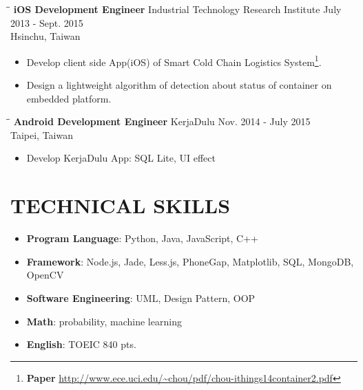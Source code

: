 \documentclass{res}
\begin{document}
\begin{resume}
\begin{itemize}
				\end{itemize}
				\begin{tabbing}
	 				\hspace{2.3in}\= \hspace{2.6in}\= \kill %
					{\bf iOS Development Engineer} \>Industrial Technology Research Institute	
					\>July 2013 - Sept. 2015\\
													\>Hsinchu, Taiwan
	 			\end{tabbing}\vspace{-20pt}
	 			\vspace{0.2in}	
				\begin{itemize}
					\item Develop client side App(iOS) of Smart Cold Chain Logistics System\footnote{​{\bf Paper}  \url{http://www.ece.uci.edu/~chou/pdf/chou-ithings14container2.pdf}}.
					\vspace{-0.05in}	
					\item Design a lightweight algorithm of detection about status of container on embedded platform.
				\end{itemize}
				\begin{tabbing}%
					\hspace{2.3in}\= \hspace{2.6in}\= \kill %
	 				{\bf Android Development Engineer }  \>KerjaDulu\> Nov. 2014 - July 2015\\
													\>Taipei, Taiwan
				\end{tabbing}\vspace{-20pt}
				\vspace{0.2in}	
				\begin{itemize}
					\item Develop KerjaDulu App: SQL Lite, UI effect
				\end{itemize}

			
			\section{TECHNICAL SKILLS}          
				\begin{itemize}
					\item {\bf Program Language}: Python, Java, JavaScript, C++
					\vspace{-0.05in}
					\item {\bf Framework}: Node.js, Jade, Less.js, PhoneGap, Matplotlib, SQL, MongoDB, OpenCV
					\vspace{-0.05in}
					\item {\bf Software Engineering}: UML, Design Pattern, OOP
					\vspace{-0.05in}
					\item {\bf Math}: probability, machine learning	
					\vspace{-0.05in}
					\item {\bf English}: TOEIC 840 pts.
				\end{itemize}


\end{resume}
\end{document}
